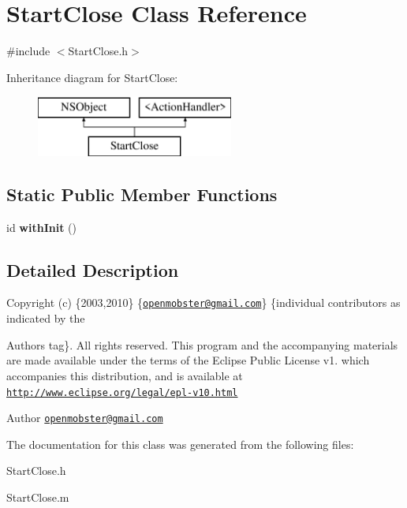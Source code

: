 \hypertarget{interface_start_close}{
\section{\-Start\-Close \-Class \-Reference}
\label{interface_start_close}
}


{\ttfamily \#include $<$\-Start\-Close.\-h$>$}

\-Inheritance diagram for \-Start\-Close\-:\begin{figure}[H]
\begin{center}
\leavevmode
\includegraphics[height=2.000000cm]{interface_start_close}
\end{center}
\end{figure}
\subsection*{\-Static \-Public \-Member \-Functions}
\begin{DoxyCompactItemize}
\item 
\hypertarget{interface_start_close_ade025fde8f9e7589f74ef9d9382c5c22}{
id {\bfseries with\-Init} ()}
\label{interface_start_close_ade025fde8f9e7589f74ef9d9382c5c22}

\end{DoxyCompactItemize}


\subsection{\-Detailed \-Description}
\-Copyright (c) \{2003,2010\} \{\href{mailto:openmobster@gmail.com}{\tt openmobster@gmail.\-com}\} \{individual contributors as indicated by the \begin{DoxyAuthor}{\-Authors}
tag\}. \-All rights reserved. \-This program and the accompanying materials are made available under the terms of the \-Eclipse \-Public \-License v1. which accompanies this distribution, and is available at \href{http://www.eclipse.org/legal/epl-v10.html}{\tt http\-://www.\-eclipse.\-org/legal/epl-\/v10.\-html}
\end{DoxyAuthor}
\begin{DoxyAuthor}{\-Author}
\href{mailto:openmobster@gmail.com}{\tt openmobster@gmail.\-com} 
\end{DoxyAuthor}


\-The documentation for this class was generated from the following files\-:\begin{DoxyCompactItemize}
\item 
\-Start\-Close.\-h\item 
\-Start\-Close.\-m\end{DoxyCompactItemize}
